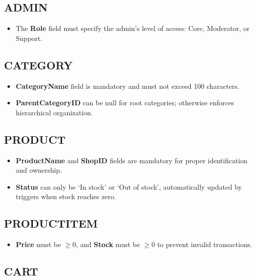 \subsection{ADMIN}

\begin{itemize}
    \item The \textbf{Role} field must specify the admin's level of access: Core, Moderator, or Support.
\end{itemize}

\subsection{CATEGORY}

\begin{itemize}
    \item \textbf{CategoryName} field is mandatory and must not exceed 100 characters.
    \item \textbf{ParentCategoryID} can be null for root categories; otherwise enforces hierarchical organization.
\end{itemize}

\subsection{PRODUCT}

\begin{itemize}
    \item \textbf{ProductName} and \textbf{ShopID} fields are mandatory for proper identification and ownership.
    \item \textbf{Status} can only be `In stock' or `Out of stock', automatically updated by triggers when stock reaches zero.
\end{itemize}

\subsection{PRODUCTITEM}

\begin{itemize}
    \item \textbf{Price} must be $\geq 0$, and \textbf{Stock} must be $\geq 0$ to prevent invalid transactions.
\end{itemize}

\subsection{CART}

